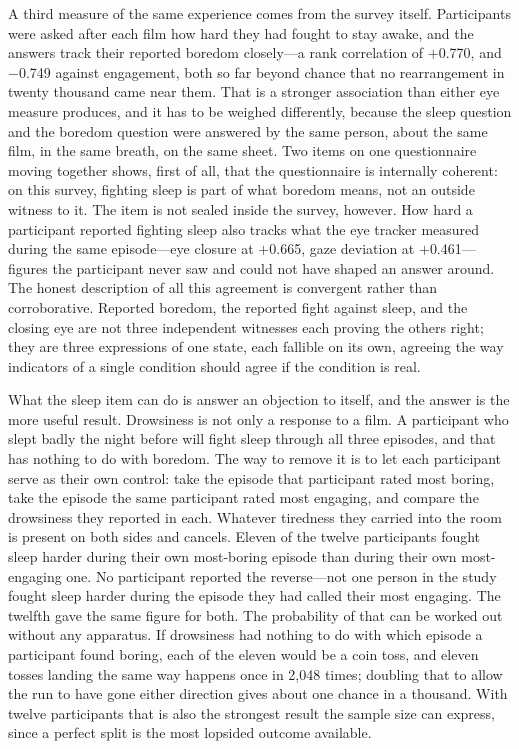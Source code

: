 A third measure of the same experience comes from the survey itself. Participants were asked
after each film how hard they had fought to stay awake, and the answers track their reported
boredom closely---a rank correlation of $+$0.770, and $-$0.749 against engagement, both so far
beyond chance that no rearrangement in twenty thousand came near them. That is a stronger
association than either eye measure produces, and it has to be weighed differently, because the
sleep question and the boredom question were answered by the same person, about the same film,
in the same breath, on the same sheet. Two items on one questionnaire moving together shows,
first of all, that the questionnaire is internally coherent: on this survey, fighting sleep is
part of what boredom means, not an outside witness to it. The item is not sealed inside the
survey, however. How hard a participant reported fighting sleep also tracks what the eye
tracker measured during the same episode---eye closure at $+$0.665, gaze deviation at
$+$0.461---figures the participant never saw and could not have shaped an answer around. The
honest description of all this agreement is convergent rather than corroborative. Reported
boredom, the reported fight against sleep, and the closing eye are not three independent
witnesses each proving the others right; they are three expressions of one state, each fallible
on its own, agreeing the way indicators of a single condition should agree if the condition is
real.

What the sleep item can do is answer an objection to itself, and the answer is the more useful
result. Drowsiness is not only a response to a film. A participant who slept badly the night
before will fight sleep through all three episodes, and that has nothing to do with boredom. The
way to remove it is to let each participant serve as their own control: take the episode that
participant rated most boring, take the episode the same participant rated most engaging, and
compare the drowsiness they reported in each. Whatever tiredness they carried into the room is
present on both sides and cancels. Eleven of the twelve participants fought sleep harder during
their own most-boring episode than during their own most-engaging one. No participant reported
the reverse---not one person in the study fought sleep harder during the episode they had called
their most engaging. The twelfth gave the same figure for both. The probability of that can be worked out without
any apparatus. If drowsiness had nothing to do with which episode a participant found boring,
each of the eleven would be a coin toss, and eleven tosses landing the same way happens once in
2,048 times; doubling that to allow the run to have gone either direction gives about one chance
in a thousand. With twelve participants that is also the strongest result the sample size can
express, since a perfect split is the most lopsided outcome available.


